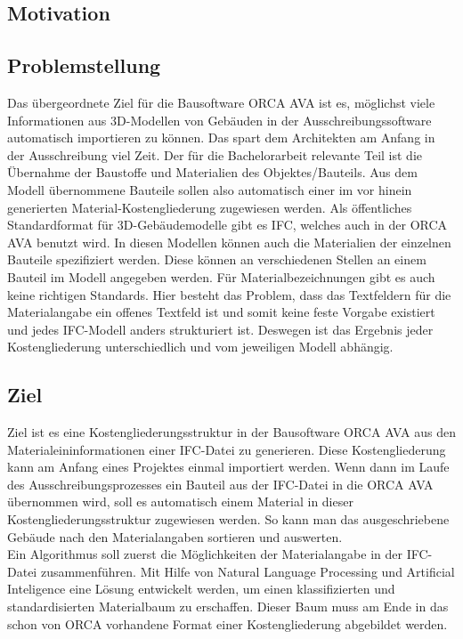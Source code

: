 \begin{onehalfspace}
\section{Motivation}
\subsection{Problemstellung}
\label{s:intro}
Das übergeordnete Ziel für die Bausoftware ORCA AVA ist es, möglichst viele Informationen aus 3D-Modellen von Gebäuden in der Ausschreibungssoftware automatisch importieren zu können. Das spart dem Architekten am Anfang in der Ausschreibung viel Zeit. Der für die Bachelorarbeit relevante Teil ist die Übernahme der Baustoffe und Materialien des Objektes/Bauteils. Aus dem Modell übernommene Bauteile sollen also automatisch einer im vor hinein generierten Material-Kostengliederung zugewiesen werden.
Als öffentliches Standardformat für 3D-Gebäudemodelle gibt es IFC, welches auch in der ORCA AVA benutzt wird. In diesen Modellen können auch die Materialien der einzelnen Bauteile spezifiziert werden. Diese können an verschiedenen Stellen an einem Bauteil im Modell angegeben werden. Für Materialbezeichnungen gibt es auch keine richtigen Standards. Hier besteht das Problem, dass das Textfeldern für die Materialangabe ein offenes Textfeld ist und somit keine feste Vorgabe existiert und jedes IFC-Modell anders strukturiert ist. Deswegen ist das Ergebnis jeder Kostengliederung unterschiedlich und vom jeweiligen Modell abhängig.

\subsection{Ziel}
Ziel ist es eine Kostengliederungsstruktur in der Bausoftware ORCA AVA aus den Materialeininformationen einer IFC-Datei zu generieren. Diese Kostengliederung kann am Anfang eines Projektes einmal importiert werden. Wenn dann im Laufe des Ausschreibungsprozesses ein Bauteil aus der IFC-Datei in die ORCA AVA übernommen wird, soll es automatisch einem Material in dieser Kostengliederungsstruktur zugewiesen werden. So kann man das ausgeschriebene Gebäude nach den Materialangaben sortieren und auswerten.
\\


Ein Algorithmus soll zuerst die Möglichkeiten der Materialangabe in der IFC-Datei zusammenführen. Mit Hilfe von Natural Language Processing und Artificial Inteligence eine Lösung entwickelt werden, um einen klassifizierten und standardisierten Materialbaum zu erschaffen. Dieser Baum muss am Ende in das schon von ORCA vorhandene Format einer Kostengliederung abgebildet werden.



\end{onehalfspace}
